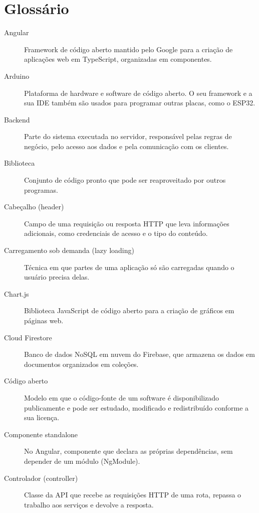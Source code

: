 \chapter*{Glossário}

\begin{description}
  \item[Angular] Framework de código aberto mantido pelo Google para a criação de aplicações web em TypeScript, organizadas em componentes.
  \item[Arduino] Plataforma de hardware e software de código aberto. O seu framework e a sua IDE também são usados para programar outras placas, como o ESP32.
  \item[Backend] Parte do sistema executada no servidor, responsável pelas regras de negócio, pelo acesso aos dados e pela comunicação com os clientes.
  \item[Biblioteca] Conjunto de código pronto que pode ser reaproveitado por outros programas.
  \item[Cabeçalho (header)] Campo de uma requisição ou resposta HTTP que leva informações adicionais, como credenciais de acesso e o tipo do conteúdo.
  \item[Carregamento sob demanda (lazy loading)] Técnica em que partes de uma aplicação só são carregadas quando o usuário precisa delas.
  \item[Chart.js] Biblioteca JavaScript de código aberto para a criação de gráficos em páginas web.
  \item[Cloud Firestore] Banco de dados NoSQL em nuvem do Firebase, que armazena os dados em documentos organizados em coleções.
  \item[Código aberto] Modelo em que o código-fonte de um software é disponibilizado publicamente e pode ser estudado, modificado e redistribuído conforme a sua licença.
  \item[Componente standalone] No Angular, componente que declara as próprias dependências, sem depender de um módulo (NgModule).
  \item[Controlador (controller)] Classe da API que recebe as requisições HTTP de uma rota, repassa o trabalho aos serviços e devolve a resposta.

\end{description}
